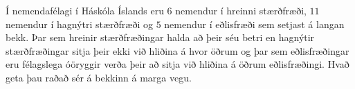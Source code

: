 Í nemendafélagi í Háskóla Íslands eru $6$ nemendur í hreinni stærðfræði, $11$ nemendur í hagnýtri stærðfræði og $5$ nemendur í eðlisfræði sem setjast á langan bekk. Þar sem hreinir stærðfræðingar halda að þeir séu betri en hagnýtir stærðfræðingar sitja þeir ekki við hliðina á hvor öðrum og þar sem eðlisfræðingar eru félagslega óöryggir verða þeir að sitja við hliðina á öðrum eðlisfræðingi. Hvað geta þau raðað sér á bekkinn á marga vegu.